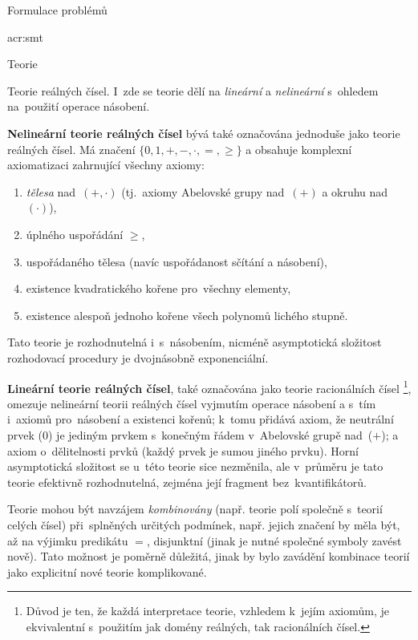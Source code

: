 \documentclass[thesis=M,czech]{FITthesis}[2012/06/26]
\newcommand{\acrlabel}[1]{acr:#1}
\newcommand{\acrf}[1]{\acrfull{\acrlabel{#1}}}
\newcommand{\hl}[1]{\textit{#1}}
\newcommand{\hll}[1]{\textbf{#1}}
\begin{document}
\begin{section}{Formulace problémů}
\begin{subsection}{\acrf{smt}}
\begin{subsubsection}{Teorie}

\begin{paragraph}{Teorie reálných čísel.}
\label{p:theory:formulation:smt:theory:real}
I~zde se teorie dělí na \hl{lineární} a \hl{nelineární}
s~ohledem na~použití operace násobení.

\hll{Nelineární teorie reálných čísel}
bývá také označována jednoduše jako teorie reálných čísel.
Má značení $\{ {0, 1}, {+, -, \cdot}, =, \geq \}$
a obsahuje komplexní axiomatizaci
zahrnující všechny axiomy:
\begin{enumerate}
\item \hl{tělesa} nad~${(+, \cdot)}$
   (tj.~axiomy Abelovské grupy nad~${(+)}$ a okruhu nad ${(\cdot)}$),
\item úplného uspořádání $\geq$,
\item uspořádaného tělesa
   (navíc uspořádanost sčítání a násobení),
\item existence kvadratického kořene pro~všechny elementy,
\item existence alespoň jednoho kořene všech polynomů lichého stupně.
\end{enumerate}
Tato teorie je rozhodnutelná i~s~násobením,
nicméně asymptotická složitost rozhodovací procedury
je dvojnásobně exponenciální.

\hll{Lineární teorie reálných čísel},
také označována jako teorie racionálních čísel%
\footnote{Důvod je ten, že každá interpretace teorie,
vzhledem k~jejím axiomům,
je ekvivalentní s~použitím
jak domény reálných, tak racionálních čísel.},
omezuje nelineární teorii reálných čísel
vyjmutím operace násobení
a s~tím i~axiomů pro~násobení a existenci kořenů;
k~tomu přidává axiom, že neutrální prvek ($0$)
je jediným prvkem s~konečným řádem v~Abelovské grupě nad~($+$);
a axiom o~dělitelnosti prvků
(každý prvek je sumou jiného prvku).
Horní asymptotická složitost se u~této teorie sice nezměnila,
ale v~průměru je tato teorie efektivně rozhodnutelná,
zejména její fragment bez~kvantifikátorů.
\end{paragraph} %


\bigskip

Teorie mohou být navzájem \hl{kombinovány}
(např. teorie polí společně s~teorií celých čísel)
při~splněných určitých podmínek,
např. jejich značení by měla být,
až na výjimku predikátu $=$, disjunktní
(jinak je nutné společné symboly
zavést nově).
Tato možnost je poměrně důležitá,
jinak by bylo zavádění kombinace teorií
jako explicitní nové teorie komplikované.
\end{subsubsection} %


\end{subsection}
\end{section}
\end{document}
